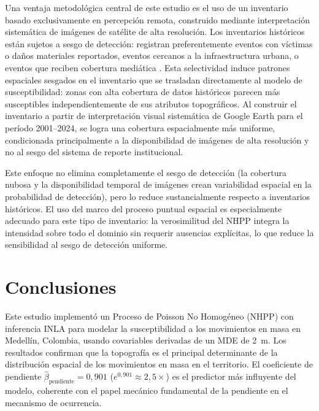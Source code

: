\documentclass[10pt, twocolumn, letterpaper]{article}
\begin{document}
Una ventaja metodológica central de este estudio es el uso de un inventario
basado exclusivamente en percepción remota, construido mediante interpretación
sistemática de imágenes de satélite de alta resolución. Los inventarios
históricos están sujetos a sesgo de detección: registran preferentemente
eventos con víctimas o daños materiales reportados, eventos cercanos a la
infraestructura urbana, o eventos que reciben cobertura mediática
\cite{guzzetti2012}. Esta selectividad induce patrones espaciales sesgados en
el inventario que se trasladan directamente al modelo de susceptibilidad: zonas
con alta cobertura de datos históricos parecen más susceptibles
independientemente de sus atributos topográficos. Al construir el inventario a
partir de interpretación visual sistemática de Google Earth para el período
2001--2024, se logra una cobertura espacialmente más uniforme, condicionada
principalmente a la disponibilidad de imágenes de alta resolución y no al sesgo
del sistema de reporte institucional.

Este enfoque no elimina completamente el sesgo de detección (la cobertura
nubosa y la disponibilidad temporal de imágenes crean variabilidad espacial en
la probabilidad de detección), pero lo reduce sustancialmente respecto a
inventarios históricos. El uso del marco del proceso puntual espacial es
especialmente adecuado para este tipo de inventario: la verosimilitud del NHPP
integra la intensidad sobre todo el dominio sin requerir ausencias explícitas,
lo que reduce la sensibilidad al sesgo de detección uniforme.

\section{Conclusiones}
\label{sec:conclusions}

Este estudio implementó un Proceso de Poisson No Homogéneo (NHPP) con
inferencia INLA para modelar la susceptibilidad a los movimientos en masa en
Medellín, Colombia, usando covariables derivadas de un MDE de \SI{2}{m}. Los
resultados confirman que la topografía es el principal determinante de la
distribución espacial de los movimientos en masa en el territorio. El
coeficiente de pendiente $\hat{\beta}_{\text{pendiente}} = 0{,}901$
($e^{0{,}901} \approx 2{,}5\times$) es el predictor más influyente del modelo,
coherente con el papel mecánico fundamental de la pendiente en el mecanismo de ocurrencia.
\end{document}

